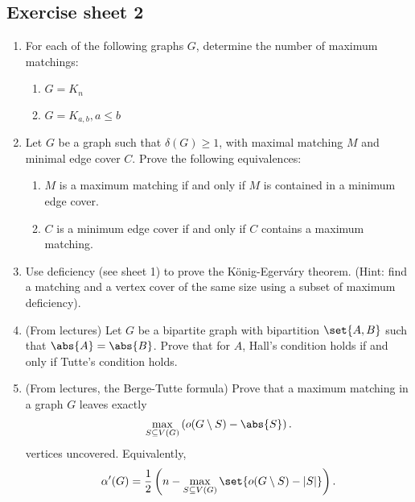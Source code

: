 \subsection*{Exercise sheet 2}
\begin{enumerate}
    \item For each of the following graphs $G$, determine the number of maximum matchings:
    \begin{enumerate}
        \item $G = K_n$
        \item $G = K_{a,b}, a \leq b$
    \end{enumerate}
    
    \item Let $G$ be a graph such that $\delta(G) \geq 1$, with maximal matching $M$ and minimal edge cover $C$. 
    Prove the following equivalences:
    \begin{enumerate}
        \item $M$ is a maximum matching if and only if $M$ is contained in a minimum edge cover.
        \item $C$ is a minimum edge cover if and only if $C$ contains a maximum matching.
    \end{enumerate}
    
    \item Use deficiency (see sheet 1) to prove the König-Egerváry theorem. 
    (Hint: find a matching and a vertex cover of the same size using a subset of maximum deficiency).
    
    \item (From lectures) Let $G$ be a bipartite graph with bipartition $\set{A, B}$ such that $\abs{A} = \abs{B}$. 
    Prove that for $A$, Hall's condition holds if and only if Tutte's condition holds.
    
    \item (From lectures, the Berge-Tutte formula) Prove that a maximum matching 
    in a graph $G$ leaves exactly
    \[
    \max_{S \subseteq V(G)} \left(o(G \setminus S) - \abs{S}\right).
    \]
    vertices uncovered. Equivalently,
    \[
    \alpha'(G) = \frac{1}{2}\left(n - \max_{S \subseteq V(G)} \set{o(G \setminus S) - |S|}\right).
    \]
\end{enumerate}
